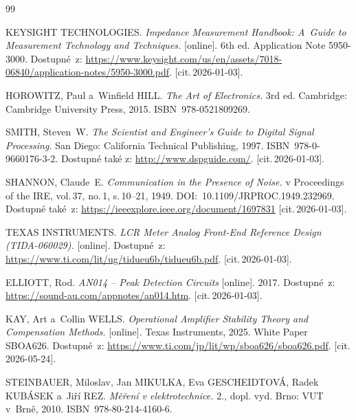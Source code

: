 
\begin{thebibliography}{99}


	KEYSIGHT TECHNOLOGIES.
	\emph{Impedance Measurement Handbook: A~Guide to Measurement Technology and Techniques.}  [online].
	6th ed.
	Application Note 5950-3000.
	Dostupné~z: \url{https://www.keysight.com/us/en/assets/7018-06840/application-notes/5950-3000.pdf}. [cit.\,2026-01-03].

	HOROWITZ, Paul a~Winfield HILL.
	\emph{The Art of Electronics.}
	3rd ed.
	Cambridge: Cambridge University Press, 2015.
	ISBN~978-0521809269.

	SMITH, Steven~W.
	\emph{The Scientist and Engineer's Guide to Digital Signal Processing.}
	San Diego: California Technical Publishing, 1997.
	ISBN~978-0-9660176-3-2.
	Dostupné také z: \url{http://www.dspguide.com/}. [cit.\,2026-01-03].

	SHANNON, Claude~E.
	\emph{Communication in the Presence of Noise.}
	v Proceedings of the IRE,
	vol.\,37, no.\,1, s.\,10--21, 1949.
	DOI:~10.1109/JRPROC.1949.232969.
	Dostupné také~z: \url{https://ieeexplore.ieee.org/document/1697831} [cit.\,2026-01-03].

	TEXAS INSTRUMENTS.
	\emph{LCR Meter Analog Front-End Reference Design (TIDA-060029).} [online].
	Dostupné~z: \url{https://www.ti.com/lit/ug/tidueu6b/tidueu6b.pdf}. [cit.\,2026-01-03].

	ELLIOTT, Rod.
	\emph{AN014 -- Peak Detection Circuits} [online].
	2017.
	Dostupné~z: \url{https://sound-au.com/appnotes/an014.htm}. [cit.\,2026-01-03].


	KAY, Art a~Collin WELLS.
	\emph{Operational Amplifier Stability Theory and Compensation Methods.} [online].
	Texas Instruments, 2025.
	White Paper SBOA626.
	Dostupné~z: \url{https://www.ti.com/jp/lit/wp/sboa626/sboa626.pdf}. [cit.\,2026-05-24].

	STEINBAUER, Miloslav, Jan MIKULKA, Eva GESCHEIDTOVÁ, Radek KUBÁSEK a~Jiří REZ.
	\emph{Měření v elektrotechnice.}
	2., dopl. vyd.
	Brno: VUT v~Brně, 2010.
	ISBN~978-80-214-4160-6.


\end{thebibliography}
